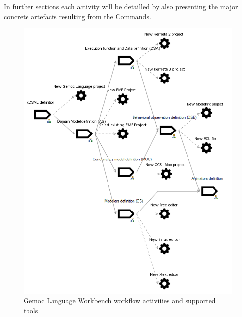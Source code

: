 \documentclass{gemoc} %
\begin{document}
In further sections each activity will be detailled by also presenting the major concrete artefacts resulting from the Commands.
\begin{figure}[h]
		\center
		\includegraphics*[trim=0.0cm 0.0cm 0cm 0.0cm, clip=true]{fig/Gemoc_workflow}
		\caption{Gemoc Language Workbench workflow activities and supported tools}
		\label{fig:gemoc_worflow}
\end{figure}
\end{document}

